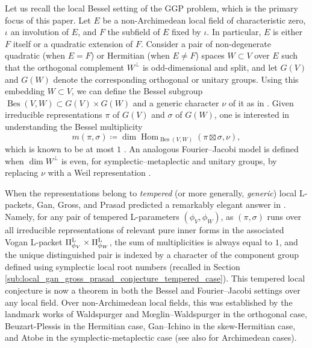 \documentclass[11pt,letterpaper]{amsart}
\theoremstyle{plain}
\newcounter{theorem}[section]
\numberwithin{theorem}{section}
\numberwithin{equation}{subsection}
\theoremstyle{remark}
\newcommand{\Hom}{\operatorname{Hom}}
\newcommand{\Bes}{\operatorname{Bes}} %
\def\LP{\Pi^{\rm L}} %
\begin{document}
Let us recall the local Bessel setting of the GGP problem, which is the primary focus of this paper. Let $E$ be a non-Archimedean local field of characteristic zero, $\iota$ an involution of $E$, and $F$ the subfield of $E$ fixed by \(\iota\). In particular, $E$ is either $F$ itself or a quadratic extension of $F$. Consider a pair of non-degenerate quadratic (when $E=F$) or Hermitian (when $E \neq F$) spaces $W \subset V$ over $E$ such that the orthogonal complement $W^\perp$ is odd-dimensional and split, and let $G\left(V\right)$ and $G\left(W\right)$ denote the corresponding orthogonal or unitary groups. Using this embedding $W \subset V$, we can define the Bessel subgroup $\Bes\left(V,W\right) \subset G\left(V\right) \times G\left(W\right)$ and a generic character $\nu$ of it as in \cite[Sect. 12]{MR3202556}. Given irreducible representations $\pi$ of $G\left(V\right)$ and $\sigma$ of $G\left(W\right)$, one is interested in understanding the Bessel multiplicity
\[
    m\left(\pi,\sigma\right) \coloneqq \dim \Hom_{\Bes\left(V,W\right)}\left(\pi \boxtimes \sigma, \nu\right),
\]
which is known to be at most $1$ \cite{MR2529937, MR2680495, MR2874638}. An analogous Fourier--Jacobi model is defined when $\dim W^\perp$ is even, for symplectic--metaplectic and unitary groups, by replacing \(\nu\) with a Weil representation \cite[Sect. 12]{MR3202556}.

\vskip 5pt

When the representations belong to \emph{tempered} (or more generally, \emph{generic}) local L-packets, Gan, Gross, and Prasad predicted a remarkably elegant answer in \cite{MR3202556}. Namely, for any pair of tempered L-parameters $\left(\phi_V, \phi_W\right)$, as $\left(\pi,\sigma\right)$ runs over all irreducible representations of relevant pure inner forms in the associated Vogan L-packet $\LP_{\phi_V} \times \LP_{\phi_W}$, the sum of multiplicities is always equal to $1$, and the unique distinguished pair is indexed by a character of the component group defined using symplectic local root numbers (recalled in Section \ref{sub:local_gan_gross_prasad_conjecture_tempered_case}). This tempered local conjecture is now a theorem in both the Bessel and Fourier--Jacobi settings over any local field. Over non-Archimedean local fields, this was established by the landmark works of Waldspurger \cite{MR2684300, MR3155344, MR3155345, MR3202558, MR3202559} and M{\oe}glin--Waldspurger \cite{MR3155346} in the orthogonal case, Beuzart-Plessis \cite{MR3251763, MR3676153} in the Hermitian case, Gan--Ichino \cite{MR3573972} in the skew-Hermitian case, and Atobe \cite{MR3788848} in the symplectic-metaplectic case (see also \cite{MR4146145, MR4568696, MR5115665, luo2020local, chenluo2022local} for Archimedean cases).
\end{document}
